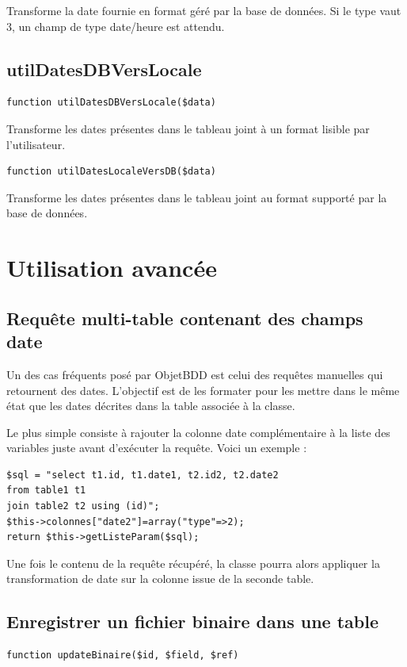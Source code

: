 Transforme la date fournie en format géré par la base de données. Si le type vaut 3, un champ de type date/heure est attendu.

\subsection{utilDatesDBVersLocale}
\begin{lstlisting}
function utilDatesDBVersLocale($data)
\end{lstlisting}

Transforme les dates présentes dans le tableau joint à un format lisible par l'utilisateur.

\begin{lstlisting}
function utilDatesLocaleVersDB($data)
\end{lstlisting}

Transforme les dates présentes dans le tableau joint au format supporté par la base de données.

\section{Utilisation avancée}
\subsection{Requête multi-table contenant des champs date}
Un des cas fréquents posé par ObjetBDD est celui des requêtes manuelles qui retournent des dates. L'objectif est de les formater pour les mettre dans le même état que les dates décrites dans la table associée à la classe.

Le plus simple consiste à rajouter la colonne date complémentaire à la liste des variables juste avant d'exécuter la requête. Voici un exemple :
\begin{lstlisting}
$sql = "select t1.id, t1.date1, t2.id2, t2.date2
from table1 t1
join table2 t2 using (id)";
$this->colonnes["date2"]=array("type"=>2);
return $this->getListeParam($sql);
\end{lstlisting}

Une fois le contenu de la requête récupéré, la classe pourra alors appliquer la transformation de date sur la colonne issue de la  seconde table.

\subsection{Enregistrer un fichier binaire dans une table}
\begin{lstlisting}
function updateBinaire($id, $field, $ref)
\end{lstlisting}

